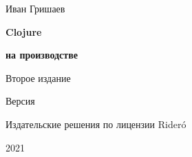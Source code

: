 
\begin{titlepage}

\begin{center}

  {Иван Гришаев}

  \vspace*{5cm}

  {\Huge\textbf{Clojure}}

  \vspace{1mm}

  {\Large\textbf{на производстве}}

  \vspace{7mm}

  {\Large Второе издание}

  {\small Версия \COMMITHASH}

  \vspace*{\fill}

  \ifridero
  {Издательские решения по лицензии Rider\'{o}}
  \fi

  {2021}

\end{center}

\end{titlepage}
